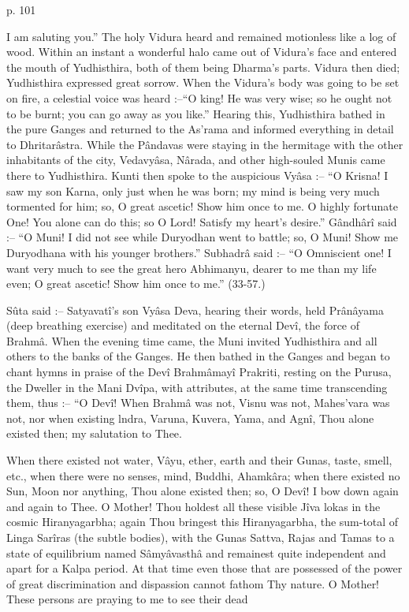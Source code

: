  

p. 101

 

I am saluting you.” The holy Vidura heard and remained motionless like a log of wood. Within an instant a wonderful halo came out of Vidura's face and entered the mouth of Yudhisthira, both of them being Dharma's parts. Vidura then died; Yudhisthira expressed great sorrow. When the Vidura's body was going to be set on fire, a celestial voice was heard :--“O king! He was very wise; so he ought not to be burnt; you can go away as you like.” Hearing this, Yudhisthira bathed in the pure Ganges and returned to the As'rama and informed everything in detail to Dhritarâstra. While the Pândavas were staying in the hermitage with the other inhabitants of the city, Vedavyâsa, Nârada, and other high-souled Munis came there to Yudhisthira. Kunti then spoke to the auspicious Vyâsa :-- “O Krisna! I saw my son Karna, only just when he was born; my mind is being very much tormented for him; so, O great ascetic! Show him once to me. O highly fortunate One! You alone can do this; so O Lord! Satisfy my heart’s desire.” Gândhârî said :-- “O Muni! I did not see while Duryodhan went to battle; so, O Muni! Show me Duryodhana with his younger brothers.” Subhadrâ said :-- “O Omniscient one! I want very much to see the great hero Abhimanyu, dearer to me than my life even; O great ascetic! Show him once to me.” (33-57.)

 

Sûta said :-- Satyavatî's son Vyâsa Deva, hearing their words, held Prânâyama (deep breathing exercise) and meditated on the eternal Devî, the force of Brahmâ. When the evening time came, the Muni invited Yudhisthira and all others to the banks of the Ganges. He then bathed in the Ganges and began to chant hymns in praise of the Devî Brahmâmayî Prakriti, resting on the Purusa, the Dweller in the Mani Dvîpa, with attributes, at the same time transcending them, thus :-- “O Devî! When Brahmâ was not, Visnu was not, Mahes'vara was not, nor when existing lndra, Varuna, Kuvera, Yama, and Agnî, Thou alone existed then; my salutation to Thee.

 

When there existed not water, Vâyu, ether, earth and their Gunas, taste, smell, etc., when there were no senses, mind, Buddhi, Ahamkâra; when there existed no Sun, Moon nor anything, Thou alone existed then; so, O Devî! I bow down again and again to Thee. O Mother! Thou holdest all these visible Jîva lokas in the cosmic Hiranyagarbha; again Thou bringest this Hiranyagarbha, the sum-total of Linga Sarîras (the subtle bodies), with the Gunas Sattva, Rajas and Tamas to a state of equilibrium named Sâmyâvasthâ and remainest quite independent and apart for a Kalpa period. At that time even those that are possessed of the power of great discrimination and dispassion cannot fathom Thy nature. O Mother! These persons are praying to me to see their dead

